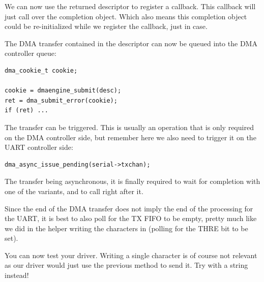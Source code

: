 \if{}\fi
\if{}\fi
\if{}\fi

We can now use the returned descriptor to register a callback. This callback
will just call  over the completion object. Which also means
this completion object could be re-initialized while we register the callback,
just in case.

The DMA transfer contained in the descriptor can now be queued into the DMA
controller queue:

\begin{verbatim}
dma_cookie_t cookie;

cookie = dmaengine_submit(desc);
ret = dma_submit_error(cookie);
if (ret) ...
\end{verbatim}

The transfer can be triggered. This is usually an operation that is only
required on the DMA controller side, but remember here we also need to trigger
it on the UART controller side:

\begin{verbatim}
dma_async_issue_pending(serial->txchan);
\end{verbatim}

The transfer being asynchronous, it is finally required to wait for completion
with one of the  variants, and to call
 right after it.

Since the end of the DMA transfer does not imply the end of the processing for
the UART, it is best to also poll for the TX FIFO to be empty, pretty much like
we did in the helper writing the characters in  (polling for the
THRE bit to be set).

You can now test your driver. Writing a single character is of course not
relevant as our driver would just use the previous method to send it. Try with
a string instead!
